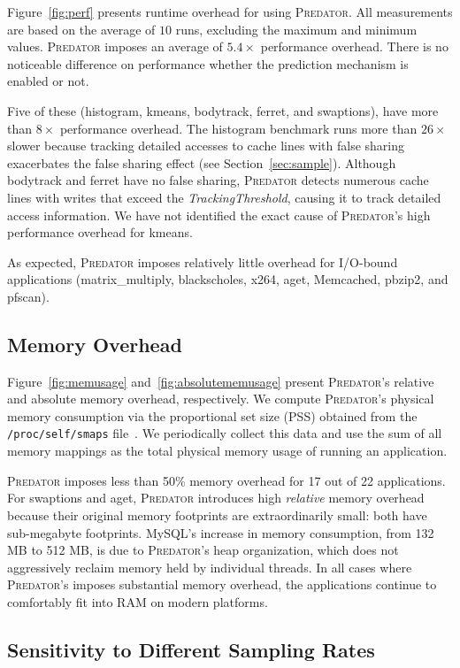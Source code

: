 \documentclass[10pt]{sigplanconf}
\newcommand{\Predator}{{\scshape Predator}}
\begin{document}
Figure~\ref{fig:perf} presents runtime overhead for using \Predator{}. All 
measurements are based on the average of $10$ runs, excluding the maximum and minimum values. \Predator{} imposes an average of $5.4\times$ performance overhead. There is no noticeable difference on performance whether the prediction mechanism is enabled or not. 

Five of these (histogram, kmeans, bodytrack, ferret, and swaptions), have more than $8\times$ performance overhead. The histogram benchmark runs more than $26\times$ slower because tracking detailed accesses to cache lines with false sharing exacerbates the false sharing effect (see Section~\ref{sec:sample}). Although bodytrack and ferret have no false sharing, \Predator{} detects numerous cache lines with writes that exceed the {\it TrackingThreshold}, causing it to track detailed access information. We have not identified the exact cause of \Predator{}'s high performance overhead for kmeans.

As expected, \Predator{} imposes relatively little overhead for I/O-bound applications (matrix\_multiply, blackscholes, x264, aget, Memcached, pbzip2, and pfscan).

\subsection{Memory Overhead}
\label{sec:memoverhead}

Figure~\ref{fig:memusage} and~\ref{fig:absolutememusage} present \Predator{}'s relative and absolute memory overhead, respectively. We compute \Predator{}'s physical memory consumption via the proportional set size (PSS) obtained from the \texttt{/proc/self/smaps} file~\cite{memusage}. We periodically collect this data and use the sum of all memory mappings as the total physical memory usage of running an application.

\Predator{} imposes less than 50\% memory overhead for 17 out of 22 applications.  For swaptions and aget, \Predator{} introduces high \emph{relative} memory overhead because their original memory footprints are extraordinarily small: both have sub-megabyte footprints. MySQL's increase in memory consumption, from 132 MB to 512 MB, is due to \Predator{}'s heap organization, which does not aggressively reclaim memory held by individual threads. In all cases where \Predator{}'s imposes substantial memory overhead, the applications continue to comfortably fit into RAM on modern platforms.

\subsection{Sensitivity to Different Sampling Rates}
\label{sec:sensitivity}
\end{document}

